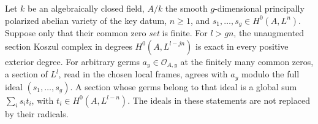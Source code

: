 \begin{srlemma}
\label{lem:ftb-koszul-finite-zero}
Let \(k\) be an algebraically closed field, \(A/k\) the smooth
\(g\)-dimensional principally polarized abelian variety of the key
datum, \(n\geq1\), and \(s_1,\ldots,s_g\in H^0(A,L^n)\).
Suppose only that their common zero \emph{set} is finite.
For \(l>gn\), the unaugmented section Koszul complex in degrees
\(H^0(A,L^{l-jn})\) is exact in every positive exterior degree.
For arbitrary germs \(a_y\in\mathcal O_{A,y}\) at the finitely many
common zeros, a section of \(L^l\), read in the chosen local frames,
agrees with \(a_y\) modulo the full ideal \((s_1,\ldots,s_g)\).
A section whose germs belong to that ideal is a global sum
\(\sum_i s_it_i\), with \(t_i\in H^0(A,L^{l-n})\).
The ideals in these statements are not replaced by their radicals.
\end{srlemma}
